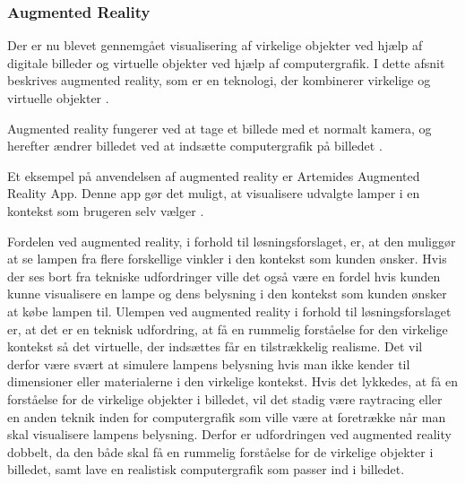 \subsubsection{Augmented Reality}
Der er nu blevet gennemgået visualisering af virkelige objekter ved hjælp af digitale billeder og virtuelle objekter ved hjælp af computergrafik. I dette afsnit beskrives augmented reality, som er en teknologi, der kombinerer virkelige og virtuelle objekter \cite{augmented_reality}.

Augmented reality fungerer ved at tage et billede med et normalt kamera, og herefter ændrer billedet ved at indsætte computergrafik på billedet \cite{augmented_reality}.

Et eksempel på anvendelsen af augmented reality er Artemides Augmented Reality App. Denne app gør det muligt, at visualisere udvalgte lamper i en kontekst som brugeren selv vælger \cite{artemides}. 

Fordelen ved augmented reality, i forhold til løsningsforslaget, er, at den muliggør at se lampen fra flere forskellige vinkler i den kontekst som kunden ønsker. Hvis der ses bort fra tekniske udfordringer ville det også være en fordel hvis kunden kunne visualisere en lampe og dens belysning i den kontekst som kunden ønsker at købe lampen til. \newline Ulempen ved augmented reality i forhold til løsningsforslaget er, at det er en teknisk udfordring, at få en rummelig forståelse for den virkelige kontekst så det virtuelle, der indsættes får en tilstrækkelig realisme. Det vil derfor være svært at simulere lampens belysning hvis man ikke kender til dimensioner eller materialerne i den virkelige kontekst. Hvis det lykkedes, at få en forståelse for de virkelige objekter i billedet, vil det stadig være raytracing eller en anden teknik inden for computergrafik som ville være at foretrække når man skal visualisere lampens belysning. Derfor er udfordringen ved augmented reality dobbelt, da den både skal få en rummelig forståelse for de virkelige objekter i billedet, samt lave en realistisk computergrafik som passer ind i billedet.

